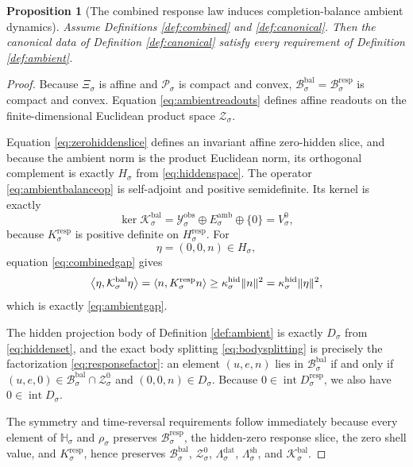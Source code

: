 \documentclass[11pt]{article}
\newcommand{\DataSpace}[1]{\mathcal Y_{#1}^{\mathrm{obs}}}
\newcommand{\AmbientTarget}[1]{E_{#1}^{\mathrm{amb}}}
\newcommand{\BalSpace}[1]{\mathcal Z_{#1}}
\newcommand{\BalBody}[1]{\mathcal B_{#1}^{\mathrm{bal}}}
\newcommand{\BalData}[1]{\Lambda_{#1}^{\mathrm{dat}}}
\newcommand{\BalShell}[1]{\Lambda_{#1}^{\mathrm{sh}}}
\newcommand{\ZeroHiddenSlice}[1]{\mathcal Z_{#1}^{0}}
\newcommand{\ZeroHiddenVec}[1]{V_{#1}^{0}}
\newcommand{\BalOp}[1]{\mathcal K_{#1}^{\mathrm{bal}}}
\newcommand{\GapSpace}[1]{H_{#1}}
\newcommand{\GapBody}[1]{D_{#1}}
\newcommand{\ProtoBody}[1]{\mathcal P_{#1}}
\newcommand{\ResponseMap}[1]{\Xi_{#1}}
\newcommand{\ResponseImage}[1]{\mathcal B_{#1}^{\mathrm{resp}}}
\newcommand{\RespGapSpace}[1]{H_{#1}^{\mathrm{resp}}}
\newcommand{\RespGapBody}[1]{D_{#1}^{\mathrm{resp}}}
\newcommand{\RespHiddenOperator}[1]{K_{#1}^{\mathrm{resp}}}
\newcommand{\ResponseSym}[1]{\mathbb H_{#1}}
\newcommand{\ResponseTime}[1]{\rho_{#1}}
\newtheorem{proposition}{Proposition}
\begin{document}
\begin{proposition}[The combined response law induces completion-balance ambient dynamics]
\label{prop:ambient}
Assume Definitions \ref{def:combined} and \ref{def:canonical}. Then the canonical data of Definition \ref{def:canonical} satisfy every requirement of Definition \ref{def:ambient}.
\end{proposition}

\begin{proof}
Because \(\ResponseMap{\sigma}\) is affine and \(\ProtoBody{\sigma}\) is compact and convex, \(\BalBody{\sigma}=\ResponseImage{\sigma}\) is compact and convex. Equation \eqref{eq:ambientreadouts} defines affine readouts on the finite-dimensional Euclidean product space \(\BalSpace{\sigma}\).

Equation \eqref{eq:zerohiddenslice} defines an invariant affine zero-hidden slice, and because the ambient norm is the product Euclidean norm, its orthogonal complement is exactly \(\GapSpace{\sigma}\) from \eqref{eq:hiddenspace}. The operator \eqref{eq:ambientbalanceop} is self-adjoint and positive semidefinite. Its kernel is exactly
\[
\ker\BalOp{\sigma}
=
\DataSpace{\sigma}\oplus \AmbientTarget{\sigma}\oplus\{0\}
=
\ZeroHiddenVec{\sigma},
\]
because \(\RespHiddenOperator{\sigma}\) is positive definite on \(\RespGapSpace{\sigma}\). For
\[
\eta=(0,0,n)\in\GapSpace{\sigma},
\]
equation \eqref{eq:combinedgap} gives
\[
\ev{\eta,\BalOp{\sigma}\eta}
=
\ev{n,\RespHiddenOperator{\sigma}n}
\ge
\kappa_{\sigma}^{\mathrm{hid}}\|n\|^{2}
=
\kappa_{\sigma}^{\mathrm{hid}}\|\eta\|^{2},
\]
which is exactly \eqref{eq:ambientgap}.

The hidden projection body of Definition \ref{def:ambient} is exactly \(\GapBody{\sigma}\) from \eqref{eq:hiddenset}, and the exact body splitting \eqref{eq:bodysplitting} is precisely the factorization \eqref{eq:responsefactor}: an element \((u,e,n)\) lies in \(\BalBody{\sigma}\) if and only if \((u,e,0)\in\BalBody{\sigma}\cap\ZeroHiddenSlice{\sigma}\) and \((0,0,n)\in\GapBody{\sigma}\). Because \(0\in\operatorname{int}\RespGapBody{\sigma}\), we also have \(0\in\operatorname{int}\GapBody{\sigma}\).

The symmetry and time-reversal requirements follow immediately because every element of \(\ResponseSym{\sigma}\) and \(\ResponseTime{\sigma}\) preserves \(\ResponseImage{\sigma}\), the hidden-zero response slice, the zero shell value, and \(\RespHiddenOperator{\sigma}\), hence preserves \(\BalBody{\sigma}\), \(\ZeroHiddenSlice{\sigma}\), \(\BalData{\sigma}\), \(\BalShell{\sigma}\), and \(\BalOp{\sigma}\).


\end{proof}
\end{document}
